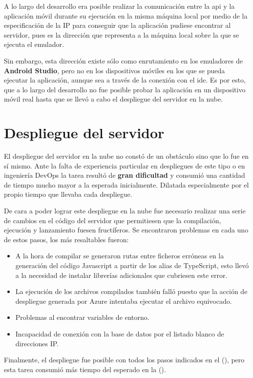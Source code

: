 A lo largo del desarrollo era posible realizar la comunicación entre la \acrshort{api} y la aplicación móvil durante su ejecución en la misma máquina local por medio de la especificación de la IP  para conseguir que la aplicación pudiese encontrar al servidor, pues es la dirección que representa a la máquina local sobre la que se ejecuta el emulador.

Sin embargo, esta dirección existe sólo como enrutamiento en los emuladores de \textbf{Android Studio}, pero no en los dispositivos móviles en los que se pueda ejecutar la aplicación, aunque sea a través de la conexión con el \acrshort{ide}. Es por esto, que a lo largo del desarrollo no fue posible probar la aplicación en un dispositivo móvil real hasta que se llevó a cabo el despliegue del servidor en la nube.

\section{Despliegue del servidor}

El despliegue del servidor en la nube no constó de un obstáculo sino que lo fue en sí mismo. Ante la falta de experiencia particular en despliegues de este tipo o en ingeniería DevOps la tarea resultó de \textbf{gran dificultad} y consumió una cantidad de tiempo mucho mayor a la esperada inicialmente. Dilatada especialmente por el propio tiempo que llevaba cada despliegue.

De cara a poder lograr este despliegue en la nube fue necesario realizar una serie de cambios en el código del servidor que permitiesen que la compilación, ejecución y lanzamiento fuesen fructíferos. Se encontraron problemas en cada uno de estos pasos, los más resaltables fueron: 
\begin{itemize}
    \item A la hora de compilar se generaron rutas entre ficheros erróneas en la generación del código Javascript a partir de los alias de TypeScript, esto llevó a la necesidad de instalar librerías adicionales que cubriesen este error.
    \item La ejecución de los archivos compilados también falló puesto que la acción de despliegue generada por Azure intentaba ejecutar el archivo equivocado.
    \item Problemas al encontrar variables de entorno.
    \item Incapacidad de conexión con la base de datos por el listado blanco de direcciones IP.
\end{itemize}

Finalmente, el despliegue fue posible con todos los pasos indicados en el  (), pero esta tarea consumió más tiempo del esperado en la  ().